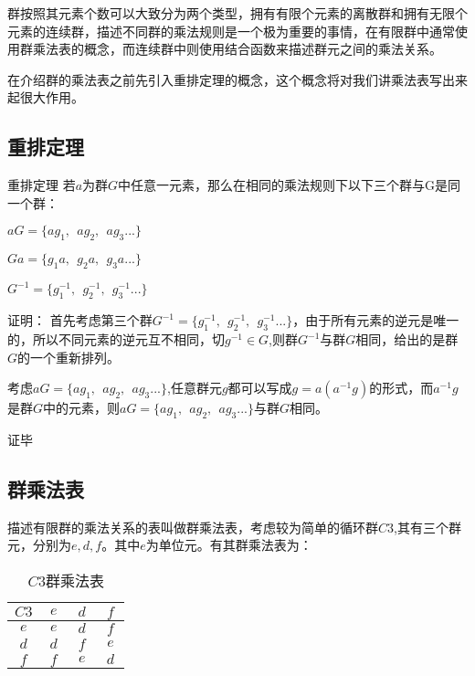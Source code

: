 

群按照其元素个数可以大致分为两个类型，拥有有限个元素的离散群和拥有无限个元素的连续群，描述不同群的乘法规则是一个极为重要的事情，在有限群中通常使用群乘法表的概念，而连续群中则使用结合函数来描述群元之间的乘法关系。

在介绍群的乘法表之前先引入重排定理的概念，这个概念将对我们讲乘法表写出来起很大作用。

\subsection{重排定理}

\begin{theorem}{重排定理}
若$a$为群$G$中任意一元素，那么在相同的乘法规则下以下三个群与G是同一个群：

$aG=\{ag_1,~~ag_2,~~ag_3...\}$

$Ga=\{g_1a,~~g_2a,~~g_3a...\}$

$G^{-1}=\{g_1^{-1},~~g_2^{-1},~~g_3^{-1}...\}$
\end{theorem}

证明：
首先考虑第三个群$G^{-1}=\{g_1^{-1},~~g_2^{-1},~~g_3^{-1}...\}$，由于所有元素的逆元是唯一的，所以不同元素的逆元互不相同，切$g^{-1}\in G$,则群$G^{-1}$与群$G$相同，给出的是群$G$的一个重新排列。

考虑$aG=\{ag_1,~~ag_2,~~ag_3...\}$,任意群元$g$都可以写成$g=a(a^{-1}g)$的形式，而$a^{-1}g$是群$G$中的元素，则$aG=\{ag_1,~~ag_2,~~ag_3...\}$与群$G$相同。

证毕

\subsection{群乘法表}

描述有限群的乘法关系的表叫做群乘法表，考虑较为简单的循环群$C3$,其有三个群元，分别为$e,d,f$。其中$e$为单位元。有其群乘法表为：

\begin{table}[ht]
\centering
\caption{$C3$群乘法表}\label{groupt_tab1}
\begin{tabular}{|c|c|c|c|}
\hline
$C3$ & $~e~$ & $~d~$ & $~f~$ \\
\hline
$e$ & $e$ & $d$ & $f$ \\
\hline
$d$ & $d$ & $f$ & $e$ \\
\hline
$f$ & $f$ & $e$ & $d$ \\
\hline
\end{tabular}
\end{table}

